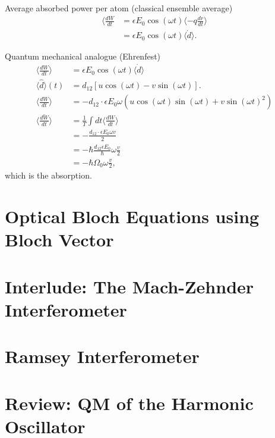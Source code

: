 \documentclass[../../note.tex]{subfiles}
\begin{document}
\begin{itemize}
    Average absorbed power per atom (classical ensemble average)
    \begin{align}
        \langle \frac{d W}{d t} 
        &= \epsilon E_0 \cos(\omega t)\langle -q \frac{d r}{d t} \rangle \\
        &= \epsilon E_0 \cos(\omega t) \langle \dot{d} \rangle.
    \end{align}

    Quantum mechanical analogue (Ehrenfest)
    \begin{align}
        \langle \frac{d W}{d t} \rangle
        &= \epsilon E_0 \cos(\omega t) \langle \dot{d} \rangle \\
        \langle \hat{d} \rangle(t)
        &= d_{12} [u \cos(\omega t) - v \sin(\omega t)]. \\
        \langle \frac{d W}{d t} \rangle
        &= -d_{12} \cdot \epsilon E_0 \omega (u \cos(\omega t) \sin(\omega t) + v \sin(\omega t)^2) \\
        \overline{\langle \frac{d W}{d t} \rangle}
        &= \frac{1}{T} \int dt \langle \frac{d W}{d t} \rangle \\
        &= - \frac{d_{12} \cdot \epsilon E_0 \omega v}{2} \\
        &= - \hbar \frac{d_{12} \epsilon E_0}{\hbar} \omega \frac{v}{2} \\
        &= - \hbar \Omega_0 \omega \frac{v}{2},
    \end{align}
    which is the absorption.
\end{itemize}

\section{Optical Bloch Equations using Bloch Vector}


\section{Interlude: The Mach-Zehnder Interferometer}

\section{Ramsey Interferometer}

\section{Review: QM of the Harmonic Oscillator}
\end{document}
